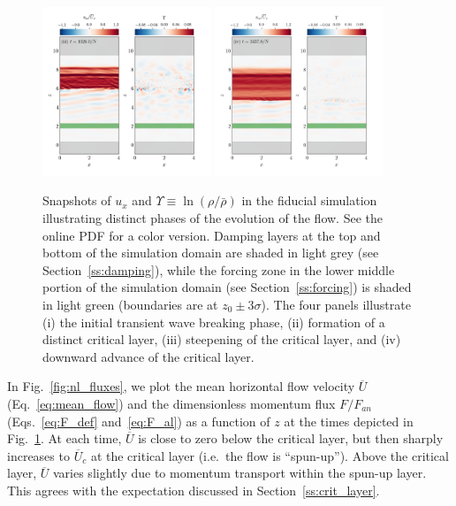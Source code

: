 \documentclass[
        fleqn,
        usenatbib,
    ]{mnras}
\newcommand*{\p}[1]{\left(#1\right)}
\begin{document}
\begin{figure}
    \includegraphics[width=0.45\textwidth]{plots/yubo_000134_labeled.png}\hfil
    \includegraphics[width=0.45\textwidth]{plots/yubo_000451_labeled.png}
    \caption{Snapshots of $u_x$ and $\Upsilon \equiv \ln \p{\rho / \bar{\rho}}$
    in the fiducial simulation illustrating distinct phases of the evolution of
    the flow. See the online PDF for a color version. Damping
    layers at the top and bottom of the simulation domain are
    shaded in light grey (see Section~\ref{ss:damping}), while the forcing zone
    in the lower middle portion of the simulation domain (see
    Section~\ref{ss:forcing}) is shaded in light green (boundaries are at $z_0
    \pm 3\sigma$). The four panels illustrate (i) the initial transient wave
    breaking phase, (ii) formation of a distinct critical layer, (iii)
    steepening of the critical layer, and (iv) downward advance of the critical
    layer.}\label{fig:snapshots}
\end{figure}

In Fig.~\ref{fig:nl_fluxes}, we plot the mean horizontal flow velocity
$\overline{U}$ (Eq.~\eqref{eq:mean_flow}) and the dimensionless momentum flux $F
/ F_{an}$ (Eqs.~\eqref{eq:F_def} and~\eqref{eq:F_al}) as a function of $z$ at
the times depicted in Fig.~\ref{fig:snapshots}. At each time, $\overline{U}$ is
close to zero below the critical layer, but then sharply increases to
$\overline{U}_c$ at the critical layer (i.e.\ the flow is ``spun-up''). Above
the critical layer, $\overline{U}$ varies slightly due to momentum transport
within the spun-up layer. This agrees with the expectation discussed in
Section~\ref{ss:crit_layer}.
\end{document}
